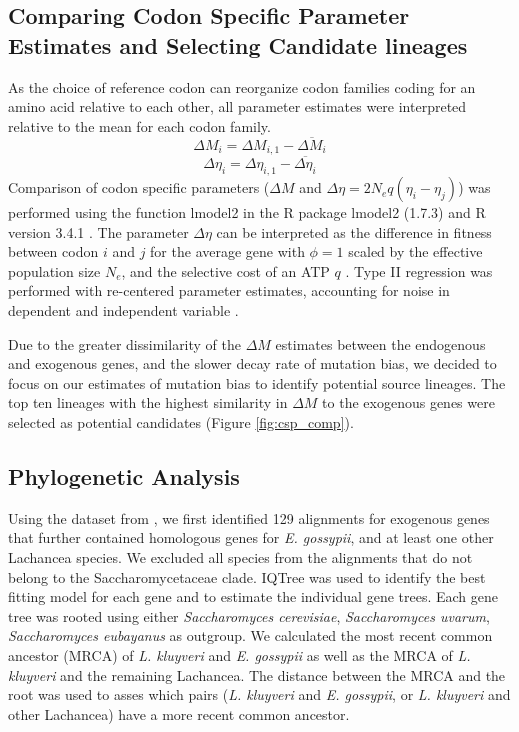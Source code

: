 \documentclass[doublespacing,linenumbers]{bmcart-modified}
\newcommand{\kluyveri}{\textit{L. kluyveri}\xspace}
\newcommand{\gossypii}{\textit{E. gossypii}\xspace}
\newcommand{\DM}{\ensuremath{{\Delta M}}\xspace}
\newcommand{\DE}{\ensuremath{{\Delta \eta}}\xspace}
\newcommand{\Ne}{\ensuremath{N_e}\xspace}
\begin{document}
\subsection*{Comparing Codon Specific Parameter Estimates and Selecting Candidate lineages}
As the choice of reference codon can reorganize codon families coding for an amino acid relative to each other, all parameter estimates were interpreted relative to the mean for each codon family.
\begin{equation}
\DM_i = \DM_{i,1} - \overline{\DM_i}
\end{equation}
\begin{equation}
\DE_i = \DE_{i,1} - \overline{\DE_i}
\end{equation}
Comparison of codon specific parameters (\DM and $\DE = 2\Ne q(\eta_i-\eta_j)$) was performed using the function lmodel2 in the R package lmodel2 (1.7.3) \citep{lmodel2} and R version 3.4.1 \citep{rcore}.
The parameter \DE can be interpreted as the difference in fitness between codon $i$ and $j$ for the average gene with $\phi = 1$ scaled by the  effective population size $\Ne$, and the selective cost of an ATP $q$ \citep{gilchrist2007, gilchrist2015}.
Type II regression was performed with re-centered parameter estimates, accounting for noise in dependent and independent variable \citep{SokalAndRohlf1981}.

Due to the greater dissimilarity of the \DM estimates between the endogenous and exogenous genes, and the slower decay rate of mutation bias, we decided to focus on our estimates of mutation bias to identify potential source lineages.
The top ten lineages with the highest similarity in \DM to the exogenous genes were selected as potential candidates (Figure \ref{fig:csp_comp}).

\subsection*{Phylogenetic Analysis}
Using the dataset from \cite{shen2018}, we first identified 129 alignments for exogenous genes that further contained homologous genes for \gossypii, and at least one other Lachancea species.
We excluded all species from the alignments that do not belong to the Saccharomycetaceae clade. 
IQTree \citep{nguyen2015} was used to identify the best fitting model for each gene and to estimate the individual gene trees.
Each gene tree was rooted using either \textit{Saccharomyces cerevisiae}, \textit{Saccharomyces uvarum}, \textit{Saccharomyces eubayanus} as outgroup.
We calculated the most recent common ancestor (MRCA) of \kluyveri and \gossypii as well as the MRCA of \kluyveri and the remaining Lachancea.
The distance between the MRCA and the root was used to asses which pairs (\kluyveri and \gossypii, or \kluyveri and other Lachancea) have a more recent common ancestor.
\end{document}
